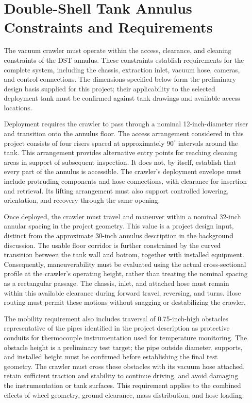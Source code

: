 \section{Double-Shell Tank Annulus Constraints and Requirements}
\label{sec:dst-constraints}
\begingroup
\setlength{\emergencystretch}{2em}

The vacuum crawler must operate within the access, clearance, and cleaning constraints of the DST annulus. These constraints establish requirements for the complete system, including the chassis, extraction inlet, vacuum hose, cameras, and control connections. The dimensions specified below form the preliminary design basis supplied for this project; their applicability to the selected deployment tank must be confirmed against tank drawings and available access locations.

Deployment requires the crawler to pass through a nominal 12-inch-diameter riser and transition onto the annulus floor. The access arrangement considered in this project consists of four risers spaced at approximately $90^{\circ}$ intervals around the tank. This arrangement provides alternative entry points for reaching cleaning areas in support of subsequent inspection. It does not, by itself, establish that every part of the annulus is accessible. The crawler's deployment envelope must include protruding components and hose connections, with clearance for insertion and retrieval. Its lifting arrangement must also support controlled lowering, orientation, and recovery through the same opening.

Once deployed, the crawler must travel and maneuver within a nominal 32-inch annular spacing in the project geometry. This value is a project design input, distinct from the approximate 30-inch annulus description in the background discussion. The usable floor corridor is further constrained by the curved transition between the tank wall and bottom, together with installed equipment. Consequently, maneuverability must be evaluated using the actual cross-sectional profile at the crawler's operating height, rather than treating the nominal spacing as a rectangular passage. The chassis, inlet, and attached hose must remain within this available clearance during forward travel, reversing, and turns. Hose routing must permit these motions without snagging or destabilizing the crawler.

The mobility requirement also includes traversal of 0.75-inch-high obstacles representative of the pipes identified in the project description as protective conduits for thermocouple instrumentation used for temperature monitoring. The obstacle height is a preliminary test target; the pipe outside diameter, supports, and installed height must be confirmed before establishing the final test geometry. The crawler must cross these obstacles with its vacuum hose attached, retain sufficient traction and stability to continue driving, and avoid damaging the instrumentation or tank surfaces. This requirement applies to the combined effects of wheel geometry, ground clearance, mass distribution, and hose loading.

